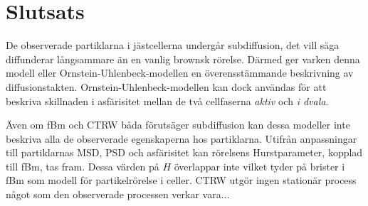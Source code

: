 \chapter{Slutsats}

De observerade partiklarna i jästcellerna undergår subdiffusion, det vill säga diffunderar långsammare än en vanlig brownsk rörelse. Därmed ger varken denna modell eller Ornstein-Uhlenbeck-modellen en överensstämmande beskrivning av diffusionstakten. Ornstein-Uhlenbeck-modellen kan dock användas för att beskriva skillnaden i asfärisitet mellan de två cellfaserna \emph{aktiv} och \emph{i dvala}.

Även om fBm och CTRW båda förutsäger subdiffusion kan dessa modeller inte beskriva alla de observerade egenskaperna hos partiklarna. Utifrån anpassningar till partiklarnas MSD, PSD och asfärisitet kan rörelsens Hurstparameter, kopplad till fBm, tas fram. Dessa värden på $H$ överlappar inte vilket tyder på brister i fBm som modell för partikelrörelse i celler. CTRW utgör ingen stationär process något som den observerade processen verkar vara...

